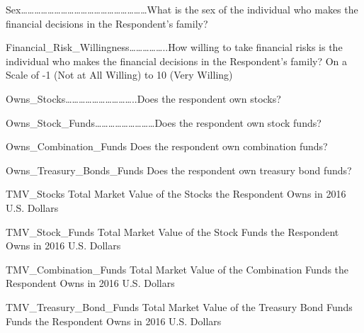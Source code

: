 \documentclass[
]{article}
\newenvironment{Shaded}{\begin{snugshade}}{\end{snugshade}}
\newcommand{\KeywordTok}[1]{\textcolor[rgb]{0.13,0.29,0.53}{\textbf{#1}}}
\newcommand{\NormalTok}[1]{#1}
\newcommand{\OperatorTok}[1]{\textcolor[rgb]{0.81,0.36,0.00}{\textbf{#1}}}
\newcommand{\StringTok}[1]{\textcolor[rgb]{0.31,0.60,0.02}{#1}}
\begin{document}
Sex\ldots\ldots\ldots\ldots\ldots\ldots\ldots\ldots\ldots\ldots\ldots\ldots\ldots\ldots\ldots\ldots\ldots\ldots\ldots What
is the sex of the individual who makes the financial decisions in the
Respondent's family?

Financial\_Risk\_Willingness\ldots\ldots\ldots\ldots\ldots..How willing
to take financial risks is the individual who makes the financial
decisions in the Respondent's family? On a Scale of -1 (Not at All
Willing) to 10 (Very Willing)

Owns\_Stocks\ldots\ldots\ldots\ldots\ldots\ldots\ldots\ldots\ldots\ldots..Does
the respondent own stocks?

Owns\_Stock\_Funds\ldots\ldots\ldots\ldots\ldots\ldots\ldots\ldots\ldots Does
the respondent own stock funds?

Owns\_Combination\_Funds Does the respondent own combination funds?

Owns\_Treasury\_Bonds\_Funds Does the respondent own treasury bond
funds?

TMV\_Stocks Total Market Value of the Stocks the Respondent Owns in 2016
U.S. Dollars

TMV\_Stock\_Funds Total Market Value of the Stock Funds the Respondent
Owns in 2016 U.S. Dollars

TMV\_Combination\_Funds Total Market Value of the Combination Funds the
Respondent Owns in 2016 U.S. Dollars

TMV\_Treasury\_Bond\_Funds Total Market Value of the Treasury Bond Funds
Funds the Respondent Owns in 2016 U.S. Dollars

\begin{Shaded}
\end{Shaded}
\end{document}
